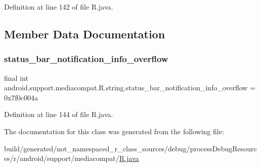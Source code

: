 Definition at line 142 of file R.\+java.


\begin{DoxyCode}{0}

\end{DoxyCode}


\subsection{Member Data Documentation}
\mbox{\label{classandroid_1_1support_1_1mediacompat_1_1_r_1_1string_a61a68d0b52b88ec2a9d2824d55d92090}} 
\subsubsection{\texorpdfstring{status\_bar\_notification\_info\_overflow}{status\_bar\_notification\_info\_overflow}}
{\footnotesize\ttfamily final int android.\+support.\+mediacompat.\+R.\+string.\+status\+\_\+bar\+\_\+notification\+\_\+info\+\_\+overflow = 0x7f0c004a\hspace{0.3cm}{\ttfamily [static]}}



Definition at line 144 of file R.\+java.



The documentation for this class was generated from the following file\+:\begin{DoxyCompactItemize}
\item 
build/generated/not\+\_\+namespaced\+\_\+r\+\_\+class\+\_\+sources/debug/process\+Debug\+Resources/r/android/support/mediacompat/\mbox{\hyperlink{android_2support_2mediacompat_2_r_8java}{R.\+java}}\end{DoxyCompactItemize}
